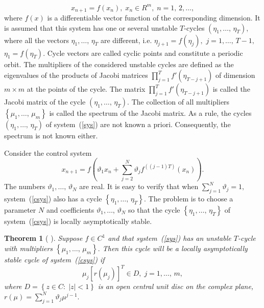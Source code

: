 \documentclass[12pt,a4paper]{amsart}
\newtheorem{theorem}{Theorem}
\begin{document}
\begin{equation}\label{sys}
x_{n+1}=f(x_n),\;x_n\in R^m,\;n=1,\,2,\ldots,
\end{equation}
where $f(x)$ is a differentiable vector function of the corresponding dimension. It is assumed that this system has one or several unstable 
$T$-cycles $\left(\eta_1,\ldots,\,\eta_T\right),$ where all the vectors $\eta_1,\ldots,\,\eta_T$ are different, i.e. $\eta_{j+1}=f(\eta_j),$ 
$j=1,\ldots,\,T-1,$ $\eta_1=f(\eta_T).$ Cycle vectors are called cyclic points and constitute a periodic orbit. The multipliers of the considered
unstable cycles are defined as the eigenvalues of the products of Jacobi matrices $\prod\limits_{j=1}^T{f'(\eta_{T-j+1})}$ of dimension 
$m\times m$ at the points of the cycle. The matrix $\prod\limits_{j=1}^T{f'(\eta_{T-j+1})}$ is called the Jacobi matrix of the cycle 
$\left(\eta_1,\ldots,\,\eta_T\right).$ The collection of all multipliers $\left\{\mu_1,\ldots,\,\mu_m\right\}$ is called the spectrum of 
the Jacobi matrix. As a rule, the cycles $\left(\eta_1,\ldots,\,\eta_T\right)$ of system~(\ref{sys}) are not known a priori. Consequently, 
the spectrum is not known either.

Consider the control system	
\begin{equation}\label{csys}
x_{n+1}=f\left(\vartheta_1 x_n + \sum\limits_{j=2}^N{\vartheta_j f^{\left((j-1)T\right)}}(x_n)\right).
\end{equation}
The numbers $\vartheta_1,\ldots,\,\vartheta_N$ are real. It is easy to verify that when $\sum\limits_{j=1}^N{\vartheta_j}=1,$ 
system~(\ref{csys}) also has a cycle $\left\{\eta_1,\ldots,\,\eta_T\right\}.$ The problem is to choose a parameter $N$ 
and coefficients $\vartheta_1,\ldots,\,\vartheta_N$ so that the cycle $\left\{\eta_1,\ldots,\,\eta_T\right\}$ of system~(\ref{csys}) 
is locally asymptotically stable.

\begin{theorem}[\cite{DSI} ]\label{th1}
Suppose $f\in C^1$ and that system~(\ref{sys}) has an unstable $T$-cycle with multipliers $\left\{\mu_1,\ldots,\,\mu_m\right\}.$
Then this cycle will be a locally asymptotically stable cycle of system~(\ref{csys}) if 
$$
\mu_j \left[r(\mu_j)\right]^T \in D,\;j=1,\ldots,\,m,
$$
where $D=\left\{z\in C:\;|z|<1\right\}$ is an open central unit disc on the complex plane, $r(\mu)=\sum\limits_{j=1}^N{\vartheta_j \mu^{j-1}}.$
\end{theorem}



\end{document}
